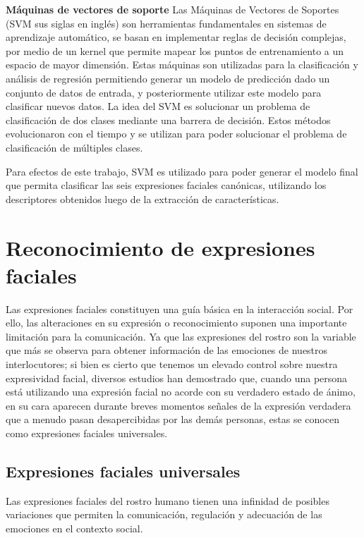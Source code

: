 	\textbf{Máquinas de vectores de soporte}
	\label{sec:svm}
	Las Máquinas de Vectores de Soportes (SVM sus siglas en inglés) son herramientas fundamentales en sistemas de aprendizaje automático, se basan en  implementar reglas de decisión complejas, por medio de un kernel que permite mapear los puntos de entrenamiento a un espacio de mayor dimensión. Estas máquinas son utilizadas para la clasificación y análisis de regresión permitiendo generar un modelo de predicción dado un conjunto de datos de entrada, y posteriormente utilizar este modelo para clasificar nuevos datos.
La idea del SVM es solucionar un problema de clasificación de dos clases mediante una barrera de decisión. Estos métodos evolucionaron con el tiempo y se utilizan para poder solucionar el problema de clasificación de múltiples clases.

Para efectos de este trabajo, SVM es utilizado para poder generar el modelo final que permita clasificar las seis expresiones faciales canónicas, utilizando los descriptores obtenidos luego de la extracción de características.

\section{Reconocimiento de expresiones faciales}
\label{sec:fer}
Las expresiones faciales constituyen una guía básica en la interacción social. Por ello, las alteraciones en su expresión o reconocimiento suponen una importante limitación para la comunicación. Ya que las expresiones del rostro son la variable que más se observa para obtener información de las emociones de nuestros interlocutores; si bien es cierto que tenemos un elevado control sobre nuestra expresividad facial, diversos estudios han demostrado que, cuando una persona está utilizando una expresión facial no acorde con su verdadero estado de ánimo, en su cara aparecen durante breves momentos señales de la expresión verdadera que a menudo pasan desapercibidas por las demás personas, estas se conocen como expresiones faciales universales.


\subsection{Expresiones faciales universales}
\label{sec:type_fe}

Las expresiones faciales del rostro humano tienen una infinidad de posibles variaciones que permiten la comunicación, regulación y adecuación de las emociones en el contexto social.


